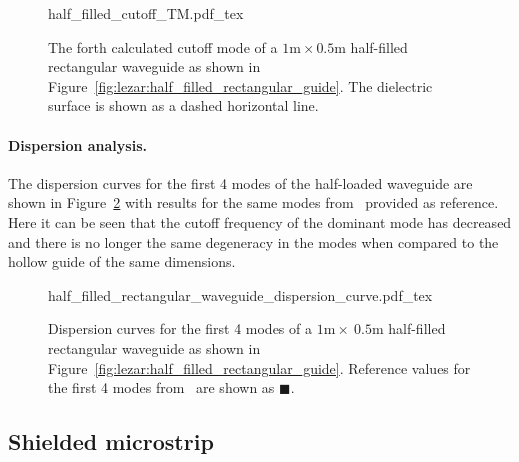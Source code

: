 \begin{figure}[h]
\centering
  \def\svgwidth{\smallfig}
    {half_filled_cutoff_TM.pdf_tex}
\caption{The forth calculated cutoff mode of a $1\text{m}\times0.5\text{m}$ half-filled rectangular waveguide as shown in Figure~\ref{fig:lezar:half_filled_rectangular_guide}. The dielectric surface is shown as a dashed horizontal line.}
\label{fig:lezar:half_filled_rectangular_cutoff_TM}
\end{figure}

\paragraph{Dispersion analysis.}

The dispersion curves for the first 4 modes of the half-loaded
waveguide are shown in
Figure~\ref{fig:lezar:half_loaded_rectangular_dispersion_curves} with
results for the same modes from~\citet{Jin2002} provided as
reference. Here it can be seen that the cutoff frequency of the
dominant mode has decreased and there is no longer the same degeneracy
in the modes when compared to the hollow guide of the same dimensions.
\begin{figure}
 \centering
  \def\svgwidth{\largefig}
  {half_filled_rectangular_waveguide_dispersion_curve.pdf_tex}
 \caption{Dispersion curves for the first 4 modes of a $1\text{m}\times~0.5\text{m}$ half-filled rectangular waveguide as shown in Figure~\ref{fig:lezar:half_filled_rectangular_guide}. Reference values for the first 4 modes from~\citet{Jin2002} are shown as $\blacksquare$.}
 \label{fig:lezar:half_loaded_rectangular_dispersion_curves}
\end{figure}

\subsection{Shielded microstrip}
\label{lezar:sec:shielded_microstrip}

